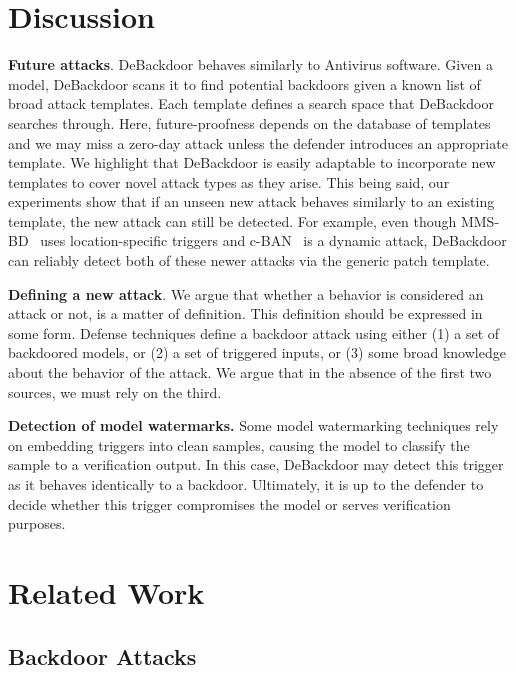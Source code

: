 \documentclass[letterpaper,twocolumn,10pt]{article}
\begin{document}
\section{Discussion}
\label{sec:discussion}

\textbf{Future attacks}. DeBackdoor behaves similarly to Antivirus software. Given a model, DeBackdoor scans it to find potential backdoors given a known list of broad attack templates. Each template defines a search space that DeBackdoor searches through. Here, future-proofness depends on the database of templates and we may miss a zero-day attack unless the defender introduces an appropriate template. We highlight that DeBackdoor is easily adaptable to incorporate new templates to cover novel attack types as they arise. This being said, our experiments show that if an unseen new attack behaves similarly to an existing template, the new attack can still be detected. For example, even though MMS-BD~\cite{kwon2022multi} uses location-specific triggers and c-BAN~\cite{salem2022dynamic} is a dynamic attack, DeBackdoor can reliably detect both of these newer attacks via the generic patch template.

\textbf{Defining a new attack}. We argue that whether a behavior is considered an attack or not, is a matter of definition. This definition should be expressed in some form. Defense techniques define a backdoor attack using either (1) a set of backdoored models, or (2) a set of triggered inputs, or (3) some broad knowledge about the behavior of the attack. We argue that in the absence of the first two sources, we must rely on the third. 

\textbf{Detection of model watermarks.} Some model watermarking techniques rely on embedding triggers into clean samples, causing the model to classify the sample to a verification output. In this case, DeBackdoor may detect this trigger as it behaves identically to a backdoor. Ultimately, it is up to the defender to decide whether this trigger compromises the model or serves verification purposes.

\section{Related Work}
\label{sec:related-work}

\subsection{Backdoor Attacks}
\label{sec:related-work-backdoor-attacks}
\end{document}
